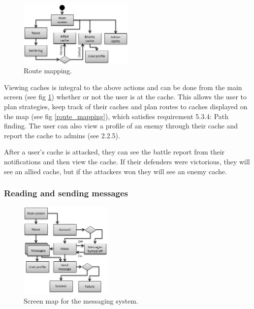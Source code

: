 \begin{figure}
	\vspace{-20pt}
	\begin{center}
	\includegraphics[width=0.5\textwidth]{images/viewing_caches}
	\caption{Route mapping.}
	\label{viewing_caches}
	\vspace{-20pt}
	\end{center}
\end{figure}

Viewing caches is integral to the above actions and can be done from the main screen (see fig \ref{viewing_caches}) whether or not the user is at the cache. This allows the user to plan strategies, keep track of their caches and plan routes to caches displayed on the map (see fig \ref{route_mapping}), which satisfies requirement 5.3.4: Path finding. The user can also view a profile of an enemy through their cache and report the cache to admins (see 2.2.5).

After a user's cache is attacked, they can see the battle report from their notifications and then view the cache. If their defenders were victorious, they will see an allied cache, but if the attackers won they will see an enemy cache.

\subsubsection{Reading and sending messages}

\begin{figure}
	\vspace{-20pt}
	\begin{center}
	\includegraphics[width=0.4\textwidth]{images/sending_messages}
	\caption{Screen map for the messaging system.}
	\label{sending_messages}
	\end{center}
	\vspace{-20pt}
\end{figure}


